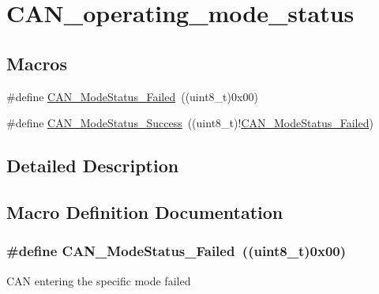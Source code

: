 \hypertarget{group___c_a_n__operating__mode__status}{}\section{C\+A\+N\+\_\+operating\+\_\+mode\+\_\+status}
\label{group___c_a_n__operating__mode__status}
\subsection*{Macros}
\begin{DoxyCompactItemize}
\item 
\#define \hyperlink{group___c_a_n__operating__mode__status_ga9882944537945325ef08e1986838ea45}{C\+A\+N\+\_\+\+Mode\+Status\+\_\+\+Failed}~((uint8\+\_\+t)0x00)
\item 
\#define \hyperlink{group___c_a_n__operating__mode__status_ga7ca0ea503eb3b3a7c0abdfad27cb6579}{C\+A\+N\+\_\+\+Mode\+Status\+\_\+\+Success}~((uint8\+\_\+t)!\hyperlink{group___c_a_n__operating__mode__status_ga9882944537945325ef08e1986838ea45}{C\+A\+N\+\_\+\+Mode\+Status\+\_\+\+Failed})
\end{DoxyCompactItemize}


\subsection{Detailed Description}


\subsection{Macro Definition Documentation}
\hypertarget{group___c_a_n__operating__mode__status_ga9882944537945325ef08e1986838ea45}{}
\subsubsection[{C\+A\+N\+\_\+\+Mode\+Status\+\_\+\+Failed}]{\setlength{\rightskip}{0pt plus 5cm}\#define C\+A\+N\+\_\+\+Mode\+Status\+\_\+\+Failed~((uint8\+\_\+t)0x00)}\label{group___c_a_n__operating__mode__status_ga9882944537945325ef08e1986838ea45}
C\+A\+N entering the specific mode failed \hypertarget{group___c_a_n__operating__mode__status_ga7ca0ea503eb3b3a7c0abdfad27cb6579}{}
